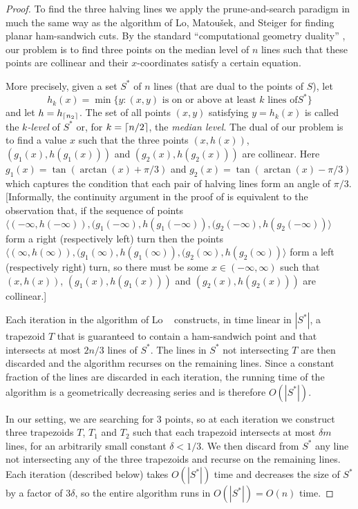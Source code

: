 \documentclass[lotsofwhite]{patmorin}
\newcommand{\blau}[1]{\tan(\arctan(#1)+\pi/3)}
\newcommand{\bleu}[1]{\tan(\arctan(#1)-\pi/3)}
\begin{document}
\begin{proof}

To find the three halving lines we apply the prune-and-search paradigm
in much the same way as the algorithm of Lo, Matou\v{s}ek, and Steiger
\cite{lms94} for finding planar ham-sandwich cuts.  By the standard
``computational geometry duality'' \cite[Section~1.3.3]{bkoo97}, our problem
is to find three points on the median level of $n$ lines such that
these points are collinear and their $x$-coordinates satisfy a certain
equation.  

More precisely, given a set $S^*$ of $n$ lines (that are dual to the
points of $S$), let
\[
    h_k(x) = \min\{ y : 
        \mbox{$(x,y)$ is on or above at least $k$ lines of
$S^*$}\} 
\]
and let $h=h_{\left\lceil n_2 \right\rceil}$.  The set of all points $(x,y)$ satisfying
$y=h_k(x)$ is called the \emph{$k$-level} of $S^*$ or, for
$k=\left\lceil n/2 \right\rceil$, the \emph{median level}.
The dual of our problem is to find a value $x$ such that the three points
$(x,h(x))$, $(g_1(x),h(g_1(x)))$ and $(g_2(x),h(g_2(x)))$ are collinear.
Here $g_1(x)=\blau{x}$ and
$g_2(x)=\bleu{x}$ which captures the condition that each pair of halving
lines form an angle of $\pi/3$.  [Informally, the continuity argument in
the proof of  is equivalent to the observation
that, if the sequence of points $\langle(-\infty,h(-\infty)),
(g_1(-\infty),h(g_1(-\infty)), (g_2(-\infty),h(g_2(-\infty))\rangle$ form
a right (respectively left) turn then the points $\langle(\infty,h(\infty)),
(g_1(\infty),h(g_1(\infty)), (g_2(\infty),h(g_2(\infty))\rangle$ form a
left (respectively right) turn, so there must be some
$x\in(-\infty,\infty)$ such that 
$(x,h(x))$, $(g_1(x),h(g_1(x)))$ and $(g_2(x),h(g_2(x)))$ are
collinear.]

Each iteration in the algorithm of Lo \etal\ \cite{lms94} constructs,
in time linear in $|S^*|$, a trapezoid $T$ that is guaranteed to
contain a ham-sandwich point and that intersects at most $2n/3$ lines
of $S^*$.  The lines in $S^*$ not intersecting $T$ are then discarded
and the algorithm recurses on the remaining lines.  Since a constant
fraction of the lines are discarded in each iteration, the running
time of the algorithm is a geometrically decreasing series and is
therefore $O(|S^*|)$.

In our setting, we are searching for 3 points, so at each iteration we
construct three trapezoids $T$, $T_1$ and $T_2$ such that each
trapezoid intersects at most $\delta m$ lines, for an arbitrarily
small constant $\delta < 1/3$.  We then discard from $S^*$ any line
not intersecting any of the three trapezoids and recurse on the
remaining lines.  Each iteration (described below) takes $O(|S^*|)$
time and decreases the size of $S^*$ by a factor of $3\delta$, so the
entire algorithm runs in $O(|S^*|)=O(n)$ time.


\end{proof}
\end{document}
